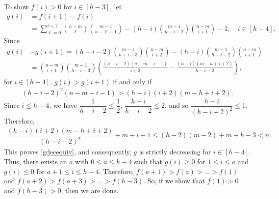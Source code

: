 \documentclass[12pt,oneside]{amsart}
\begin{document}
To show $f(i)> 0$ for $i\in [h-3]$, let
\begin{align*}
    g(i) &= f(i+1) - f(i)\\
    &= \sum_{\ell=0}^{i+1}\binom{n-m}{\ell}\binom{m-1}{h-\ell-1} - (h-i)\binom{m-1}{h-i-2}\binom{n-m}{i+1} - 1, \quad i\in [h-4]. 
\end{align*}
Since 
\begin{align*}
g(i)&-g(i+1) =  (h-i-2)\binom{m-1}{h-i-3}\binom{n-m}{i+2}-(h-i)\binom{m-1}{h-i-2}\binom{n-m}{i+1}\\
&=\binom{n-m}{i+1}\binom{m-1}{h-i-3}\left(\frac{(h-i-2)(n-m-i-1)}{i+2}-\frac{(h-i)(m-h+i+2)}{h-i-2}\right),
\end{align*}
for $i\in[h-4]$,   $g(i)> g(i+1)$ if and only if
\begin{align}\label{gdecequiv}
(h-i-2)^2(n-m-i-1)> (h-i)(i+2)(m-h+i+2).
\end{align}
Since  $i\leq h-4$, we have $\dfrac{1}{h-i-2} \leq \dfrac{1}{2}$, $\dfrac{h-i}{h-i-2} \leq 2$, and so $\dfrac{h-i}{(h-i-2)^2} \leq 1$. Therefore, 
\begin{align*}
    \dfrac{(h-i)(i+2)(m-h+i+2)}{(h-i-2)^2} + m+i+1 \leq    (h-2)(m-2)+m+h-3< n.
\end{align*}
This proves \eqref{gdecequiv}, and consequently, $g$ is strictly decreasing for $i\in[h-4]$. Thus, there exists an $a$ with $0\leq a\leq h-4$ such that $g(i)\geq 0$ for $1\leq i\leq a$ and $g(i)\leq 0$ for $a+1\leq i\leq h-4$. Therefore, $f(a+1)>f(a)>\dots>f(1)$ and  $f(a+2)>f(a+3)>\dots>f(h-3)$. So, if we show that $f(1)>0$ and $f(h-3)>0$, then we are done.
\end{document}
